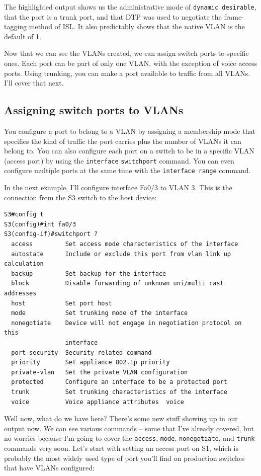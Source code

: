 \documentclass[b5paper,11pt]{memoir}
\begin{document}
The highlighted output shows us the administrative mode of
\texttt{dynamic\ desirable}, that the port is a trunk port, and that DTP
was used to negotiate the frame-tagging method of ISL. It also
predictably shows that the native VLAN is the default of 1.

Now that we can see the VLANs created, we can assign switch ports to
specific ones. Each port can be part of only one VLAN, with the
exception of voice access ports. Using trunking, you can make a port
available to traffic from all VLANs. I'll cover that next.

\subsection{Assigning switch ports to VLANs}

You configure a port to belong to a VLAN by assigning a membership mode
that specifies the kind of traffic the port carries plus the number of
VLANs it can belong to. You can also configure each port on a switch to
be in a specific VLAN (access port) by using the
\texttt{inter}\texttt{face} \texttt{switchport} command. You can even
configure multiple ports at the same time with the
\texttt{interface\ range} command.

In the next example, I'll configure interface Fa0/3 to VLAN 3. This is
the connection from the S3 switch to the host device:

\begin{verbatim}
S3#config t
S3(config)#int fa0/3
S3(config-if)#switchport ?
  access         Set access mode characteristics of the interface
  autostate      Include or exclude this port from vlan link up calculation
  backup         Set backup for the interface
  block          Disable forwarding of unknown uni/multi cast addresses
  host           Set port host
  mode           Set trunking mode of the interface
  nonegotiate    Device will not engage in negotiation protocol on this
                 interface
  port-security  Security related command
  priority       Set appliance 802.1p priority
  private-vlan   Set the private VLAN configuration
  protected      Configure an interface to be a protected port
  trunk          Set trunking characteristics of the interface
  voice          Voice appliance attributes  voice
\end{verbatim}

Well now, what do we have here? There's some new stuff showing up in our
output now. We can see various commands -- some that I've already
covered, but no worries because I'm going to cover the \texttt{access},
\texttt{mode}, \texttt{nonegotiate}, and \texttt{trunk} commands very
soon. Let's start with setting an access port on S1, which is probably
the most widely used type of port you'll find on production switches
that have VLANs configured:
\end{document}

